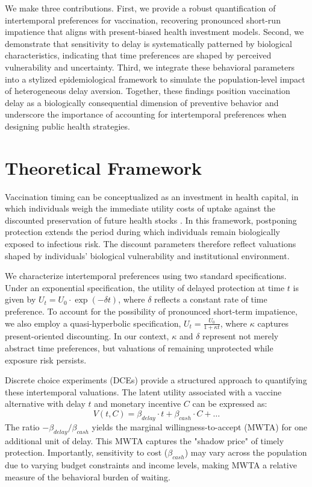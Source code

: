 \documentclass[12pt]{article}
\begin{document}
We make three contributions. First, we provide a robust quantification of intertemporal 
preferences for vaccination, recovering pronounced short-run impatience that aligns with 
present-biased health investment models. Second, we demonstrate that sensitivity to delay is 
systematically patterned by biological characteristics, indicating that time preferences 
are shaped by perceived vulnerability and uncertainty. Third, we integrate these behavioral 
parameters into a stylized epidemiological framework to simulate the population-level 
impact of heterogeneous delay aversion. Together, these findings position vaccination delay 
as a biologically consequential dimension of preventive behavior and underscore the 
importance of accounting for intertemporal preferences when designing public health 
strategies.


\section{Theoretical Framework}

Vaccination timing can be conceptualized as an investment in health capital, in which 
individuals weigh the immediate utility costs of uptake against the discounted preservation 
of future health stocks \citep{grossman1972concept}. In this framework, postponing 
protection extends the period during which individuals remain biologically exposed to 
infectious risk. The discount parameters therefore reflect valuations shaped by individuals' 
biological vulnerability and institutional environment.

We characterize intertemporal preferences using two standard specifications. Under an 
exponential specification, the utility of delayed protection at time $t$ is given by 
$U_t = U_0 \cdot \exp(-\delta t)$, where $\delta$ reflects a constant rate of time preference. 
To account for the possibility of pronounced short-term impatience, we also employ a 
quasi-hyperbolic specification, $U_t = \frac{U_0}{1 + \kappa t}$, where $\kappa$ captures 
present-oriented discounting. In our context, $\kappa$ and $\delta$ represent not merely 
abstract time preferences, but valuations of remaining unprotected while exposure risk 
persists.

Discrete choice experiments (DCEs) provide a structured approach to quantifying these 
intertemporal valuations. The latent utility associated with a vaccine alternative with 
delay $t$ and monetary incentive $C$ can be expressed as:
\[
V(t, C) = \beta_{delay} \cdot t + \beta_{cash} \cdot C + \dots
\]
The ratio $-\beta_{delay} / \beta_{cash}$ yields the marginal willingness-to-accept (MWTA) 
for one additional unit of delay. This MWTA captures the "shadow price" of timely protection. 
Importantly, sensitivity to cost ($\beta_{cash}$) may vary across the population due to 
varying budget constraints and income levels, making MWTA a relative measure of the 
behavioral burden of waiting.
\end{document}
